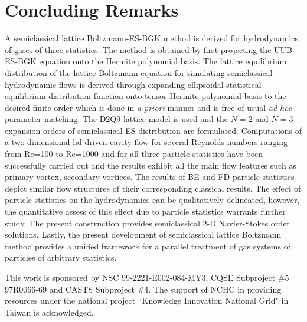 \documentclass[doublecol]{epl2}
\begin{document}
\section{Concluding Remarks}
A semiclassical lattice Boltzmann-ES-BGK method is derived for hydrodynamics of gases of three statistics. The method is obtained by first projecting the UUB-ES-BGK equation onto the Hermite polynomial basis.  The lattice equilibrium distribution of the lattice Boltzmann equation for simulating semiclassical hydrodynamic flows is derived through expanding ellipsoidal statistical equilibrium distribution function onto tensor Hermite polynomial basis to the desired finite order which is done in {\sl a priori} manner and is free of usual {\sl ad hoc} parameter-matching. The D2Q9 lattice model is used and the $N=2$ and $N=3$ expansion orders of semiclassical ES distribution are formulated. Computations of a two-dimensional lid-driven cavity flow for several Reynolds numbers ranging from Re=100 to Re=1000 and for all three particle statistics have been successfully carried out and the results exhibit all the main flow features such as primary vortex, secondary vortices. The results of BE and FD particle statistics depict similar flow structures of their corresponding classical results. The effect of particle statistics on the hydrodynamics can be qualitatively delineated, however, the quantitative assess of this effect due to particle statistics  warrants further study.  The present
construction provides semiclassical 2-D Navier-Stokes order solutions. Lastly, the present development of semiclassical lattice Boltzmann method provides a unified framework for a parallel treatment of gas systems of particles of arbitrary statistics.

\acknowledgments
This work is sponsored by NSC 99-2221-E002-084-MY3, CQSE Subproject \#5 97R0066-69 and CASTS Subproject \#4.  The support of NCHC in
providing resources under the national project ``Knowledge Innovation National Grid" in Taiwan is acknowledged.
\end{document}
